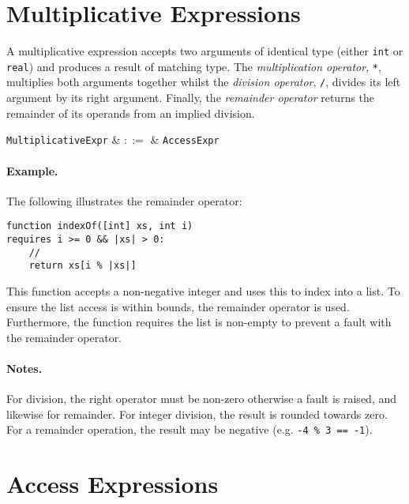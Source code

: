 \section{Multiplicative Expressions}
\label{c_expr_mul}

A multiplicative expression accepts two arguments of identical type (either \lstinline{int} or \lstinline{real}) and produces a result of matching type.  The {\em multiplication operator}, \lstinline{*}, multiplies both arguments together whilst the {\em division operator}, \lstinline{/}, divides its left argument by its right argument.  Finally, the {\em remainder operator} returns the remainder of its operands from an implied division.  

\begin{syntax}
  \verb+MultiplicativeExpr+ & $::=$ & \verb+AccessExpr+ \\
\end{syntax}

\paragraph{Example.} The following illustrates the remainder operator:

\begin{lstlisting}
function indexOf([int] xs, int i)
requires i >= 0 && |xs| > 0:
    //
    return xs[i % |xs|]
\end{lstlisting}
This function accepts a non-negative integer and uses this to index into a list.  To ensure the list access is within bounds, the remainder operator is used.  Furthermore, the function requires the list is non-empty to prevent a fault with the remainder operator.

\paragraph{Notes.}  For division, the right operator must be non-zero otherwise a \gls{fault} is raised, and likewise for remainder.  For integer division, the result is rounded towards zero.  For a remainder operation, the result may be negative (e.g. \lstinline{-4 % 3 == -1}).


\section{Access Expressions}
\label{c_expr_access}


